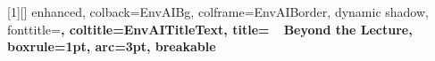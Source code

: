 [1][]{
enhanced,
colback=EnvAIBg,
colframe=EnvAIBorder,
dynamic shadow,
fonttitle=\bfseries\sffamily,
coltitle=EnvAITitleText,
title={\faPlusCircle\ \ Beyond the Lecture},
boxrule=1pt,
arc=3pt,
breakable
}


\newif\ifbooksources
\newcommand{\source}[1]{%
  \ifbooksources
    \par\noindent{\footnotesize\sffamily\color{black!45}\faVideo\ \ #1}\par\smallskip
  \fi}
